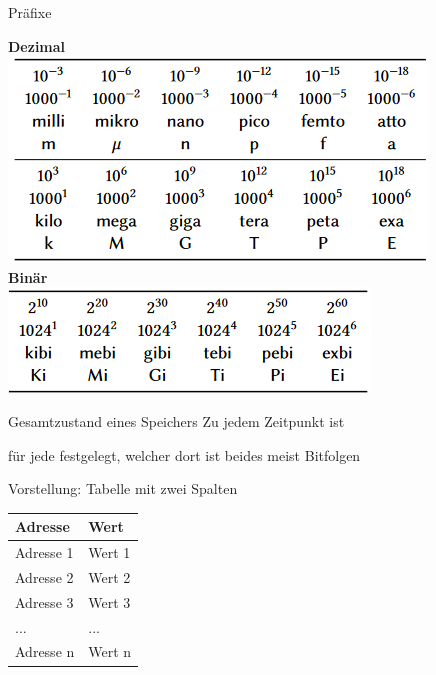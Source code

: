 \documentclass[handout]{beamer}
\begin{document}
\begin{frame}{Präfixe}
	\begin{center}
		\textbf{Dezimal}\\
		\includegraphics[scale=0.6]{../images/dezimal.png}\\ \pause
		\textbf{Binär}\\
		\includegraphics[scale=0.6]{../images/binaer.png}
	\end{center}
	
\end{frame}

\begin{frame}{Gesamtzustand eines Speichers}
	\p Zu jedem Zeitpunkt ist
	\begin{itemize}
		\pitem für jede  festgelegt, welcher  dort ist
		\pitem beides meist Bitfolgen
	\end{itemize}
	\p Vorstellung: Tabelle mit zwei Spalten\\
	\begin{center}
		\begin{tabular}{|l l|}
			\hline
			\textbf{Adresse} & \textbf{Wert} \\
			\hline
			Adresse 1& Wert 1 \\
			Adresse 2 & Wert 2 \\
			Adresse 3 & Wert 3 \\
			...&...\\
			Adresse n & Wert n\\
			\hline
		\end{tabular}
	\end{center}
\end{frame}
\end{document}
